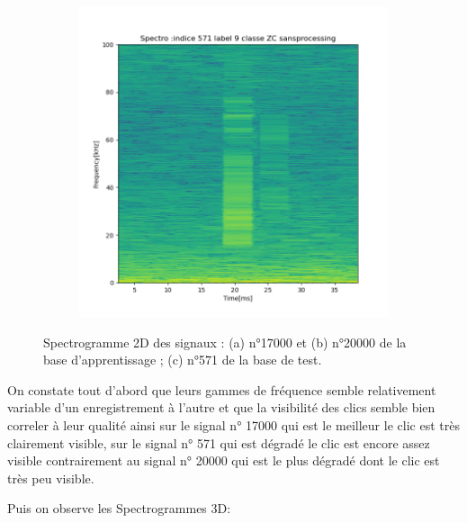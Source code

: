 \begin{figure}[!h]
\begin{subfigure}[b]{0.3\textwidth}
  \end{subfigure}
  \begin{subfigure}[b]{0.3\textwidth}
    \includegraphics[width=\textwidth]{./images/indice571Spectro2Dlabel9classeZCsansprocessingsanszoom.png}
  \end{subfigure}
  \caption{Spectrogramme 2D des signaux : (a) n°17000 et (b) n°20000 de la base d'apprentissage ; (c) n°571 de la base de test.%
  \label{fig:spectros2D}}
\end{figure}

On constate tout d'abord  que leurs gammes de fréquence semble relativement variable d'un enregistrement à l'autre et que la visibilité des clics semble bien correler à leur qualité ainsi sur le signal n° 17000 qui est le meilleur le clic est très clairement visible, sur le signal n° 571 qui est dégradé le clic est encore assez visible contrairement au signal n° 20000 qui est le plus dégradé dont le clic est très peu visible.

Puis on observe les Spectrogrammes 3D:

